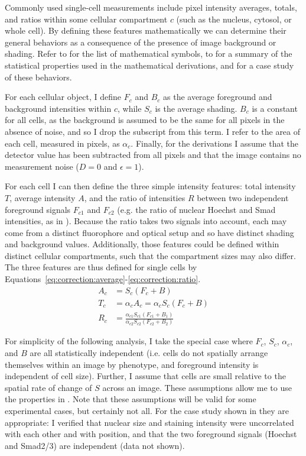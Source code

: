 Commonly used single-cell measurements include pixel intensity averages,
totals, and ratios within some cellular compartment $c$ (such as the
nucleus, cytosol, or whole cell).
By defining these features mathematically we
can determine their general behaviors as a consequence of the presence of image background
or shading. Refer to  for the list of mathematical
symbols, to  for a summary of the statistical
properties used in the mathematical derivations, and
 for a case study of these behaviors.


For each cellular object, I define $F_c$ and $B_c$ as the average foreground
and background intensities within $c$, while $S_c$ is the
average shading. $B_c$ is a constant for all cells,
as the background is assumed to be the same for all
pixels in the absence of noise, and so I drop the subscript from this term.
I refer to the area of each cell, measured in pixels, as $\alpha_c$.
Finally, for the derivations I assume that the detector value has
been subtracted from all pixels
and that the image contains no measurement noise  ($D=0$
and $\epsilon=1$).


For each cell I can then define the three simple intensity features: total intensity $T$,
average intensity $A$, and the ratio of intensities $R$ between two independent foreground
signals $F_{c1}$ and $F_{c2}$ (e.g. the ratio of nuclear Hoechst and Smad intensities, as in
). Because the ratio takes two signals into account, each may
come from a distinct fluorophore and optical setup and so have 
distinct shading and background values. Additionally, those features could be
defined within distinct cellular compartments, such that the compartment
sizes may also differ.
The three features are thus defined for single cells by 
Equations~\ref{eq:correction:average}\nobreakdash-\ref{eq:correction:ratio}.
	\begin{align}
	A_c & = S_c (F_c+B) \label{eq:correction:average}\\
	T_c & = \alpha_c A_c = \alpha_c S_c (F_c+B) \label{eq:correction:total}\\
	R_c & = \frac{ \alpha_{c1} S_{c1}(F_{c1}+B_1) }{ \alpha_{c2} S_{c2}(F_{c2}+B_2) }  \label{eq:correction:ratio}
	\end{align}
	

For simplicity of the following analysis, I take the special case where
$F_c$, $S_c$, $\alpha_c$, and $B$ are all
statistically independent (i.e. cells do not
spatially arrange themselves within an image
by phenotype, and foreground intensity is
independent of cell size). Further, I
assume that cells are small relative to the
spatial rate of change of $S$ across an image.
These assumptions 
allow me to use the properties in
. Note that these assumptions
will be valid for some experimental cases, but
certainly not all. For the case study
shown in  they are appropriate:
I verified that nuclear size and staining intensity
were uncorrelated with each other and with position, and that the two
foreground signals (Hoechst and Smad2/3) are independent (data not shown).


